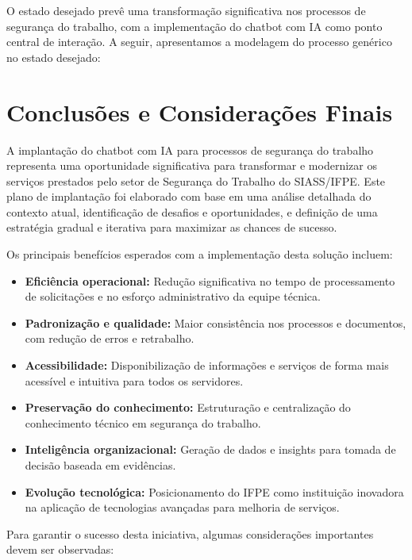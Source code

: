 \documentclass[12pt,a4paper]{article}
\begin{document}
O estado desejado prevê uma transformação significativa nos processos de segurança do trabalho, com a implementação do chatbot com IA como ponto central de interação. A seguir, apresentamos a modelagem do processo genérico no estado desejado:

\section{Conclusões e Considerações Finais}

A implantação do chatbot com IA para processos de segurança do trabalho representa uma oportunidade significativa para transformar e modernizar os serviços prestados pelo setor de Segurança do Trabalho do SIASS/IFPE. Este plano de implantação foi elaborado com base em uma análise detalhada do contexto atual, identificação de desafios e oportunidades, e definição de uma estratégia gradual e iterativa para maximizar as chances de sucesso.

Os principais benefícios esperados com a implementação desta solução incluem:

\begin{itemize}
    \item \textbf{Eficiência operacional:} Redução significativa no tempo de processamento de solicitações e no esforço administrativo da equipe técnica.
    
    \item \textbf{Padronização e qualidade:} Maior consistência nos processos e documentos, com redução de erros e retrabalho.
    
    \item \textbf{Acessibilidade:} Disponibilização de informações e serviços de forma mais acessível e intuitiva para todos os servidores.
    
    \item \textbf{Preservação do conhecimento:} Estruturação e centralização do conhecimento técnico em segurança do trabalho.
    
    \item \textbf{Inteligência organizacional:} Geração de dados e insights para tomada de decisão baseada em evidências.
    
    \item \textbf{Evolução tecnológica:} Posicionamento do IFPE como instituição inovadora na aplicação de tecnologias avançadas para melhoria de serviços.
\end{itemize}

Para garantir o sucesso desta iniciativa, algumas considerações importantes devem ser observadas:
\end{document}
